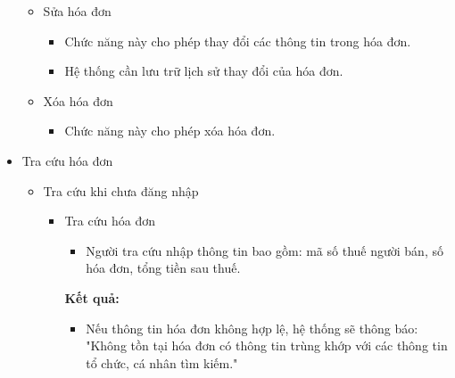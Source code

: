 \begin{itemize}
\begin{itemize}
\item Sửa hóa đơn

\begin{itemize}

\item Chức năng này cho phép thay đổi các thông tin trong hóa đơn.

\item Hệ thống cần lưu trữ lịch sử thay đổi của hóa đơn.

\end{itemize}




\item Xóa hóa đơn

\begin{itemize}

\item Chức năng này cho phép xóa hóa đơn.

\end{itemize}

\end{itemize}

\item Tra cứu hóa đơn

\begin{itemize}

\item Tra cứu khi chưa đăng nhập

\begin{itemize}

\item Tra cứu hóa đơn

\begin{itemize}

\item Người tra cứu nhập thông tin bao gồm: mã số thuế người bán, số hóa đơn, tổng tiền sau thuế.

\end{itemize}

\textbf{Kết quả:}

\begin{itemize}

\item Nếu thông tin hóa đơn không hợp lệ, hệ thống sẽ thông báo: "Không tồn tại hóa đơn có thông tin trùng khớp với các thông tin tổ chức, cá nhân tìm kiếm." %


\end{itemize}
\end{itemize}
\end{itemize}
\end{itemize}
